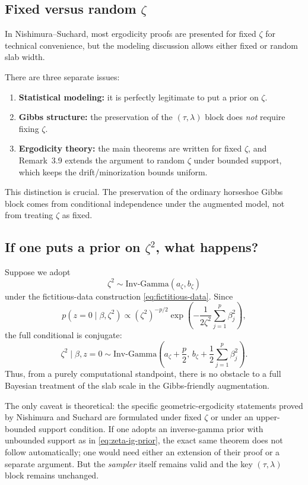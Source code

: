 \documentclass[11pt]{article}
\newcommand{\IG}{\mathrm{Inv\mbox{-}Gamma}}
\begin{document}
\subsection{Fixed versus random $\zeta$}

In Nishimura--Suchard, most ergodicity proofs are presented for fixed $\zeta$ for technical convenience, but the modeling discussion allows either fixed or random slab width.

There are three separate issues:
\begin{enumerate}
\item \textbf{Statistical modeling:} it is perfectly legitimate to put a prior on $\zeta$.
\item \textbf{Gibbs structure:} the preservation of the $(\tau,\lambda)$ block does \emph{not} require fixing $\zeta$.
\item \textbf{Ergodicity theory:} the main theorems are written for fixed $\zeta$, and Remark~3.9 extends the argument to random $\zeta$ under bounded support, which keeps the drift/minorization bounds uniform.
\end{enumerate}

This distinction is crucial. The preservation of the ordinary horseshoe Gibbs block comes from conditional independence under the augmented model, not from treating $\zeta$ as fixed.

\subsection{If one puts a prior on $\zeta^2$, what happens?}

Suppose we adopt
\begin{equation}
\zeta^2 \sim \IG(a_\zeta,b_\zeta)
\label{eq:zeta-ig-prior}
\end{equation}
under the fictitious-data construction \eqref{eq:fictitious-data}. Since
\[
p(z=0 \mid \beta,\zeta^2)
\propto
(\zeta^2)^{-p/2}
\exp\!\left(-\frac{1}{2\zeta^2}\sum_{j=1}^p \beta_j^2\right),
\]
the full conditional is conjugate:
\begin{equation}
\zeta^2 \mid \beta,z=0
\sim
\IG\!\left(a_\zeta+\frac{p}{2},\,
b_\zeta+\frac{1}{2}\sum_{j=1}^p \beta_j^2\right).
\label{eq:zeta-full-conditional}
\end{equation}
Thus, from a purely computational standpoint, there is no obstacle to a full Bayesian treatment of the slab scale in the Gibbs-friendly augmentation.

The only caveat is theoretical: the specific geometric-ergodicity statements proved by Nishimura and Suchard are formulated under fixed $\zeta$ or under an upper-bounded support condition. If one adopts an inverse-gamma prior with unbounded support as in \eqref{eq:zeta-ig-prior}, the exact same theorem does not follow automatically; one would need either an extension of their proof or a separate argument. But the \emph{sampler} itself remains valid and the key $(\tau,\lambda)$ block remains unchanged.
\end{document}
